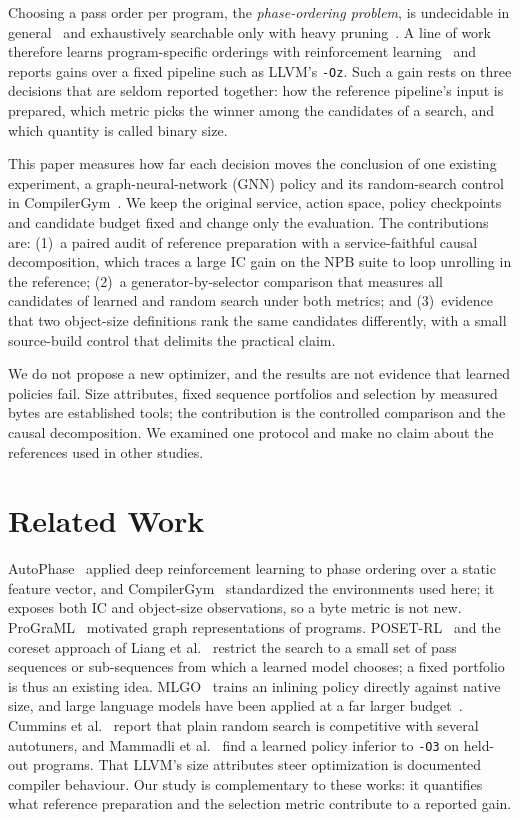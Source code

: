 \documentclass[conference,a4paper]{IEEEtran}
\begin{document}
Choosing a pass order per program, the \emph{phase-ordering problem},
is undecidable in general~\cite{touati2006} and exhaustively searchable
only with heavy pruning~\cite{kulkarni2006}. A line of work therefore
learns program-specific orderings with reinforcement
learning~\cite{autophase,compilergym,posetrl,coreset,mammadli} and
reports gains over a fixed pipeline such as LLVM's \texttt{-Oz}. Such a
gain rests on three decisions that are seldom reported together: how
the reference pipeline's input is prepared, which metric picks the
winner among the candidates of a search, and which quantity is called
binary size.

This paper measures how far each decision moves the conclusion of one
existing experiment, a graph-neural-network (GNN) policy and its
random-search control in CompilerGym~\cite{compilergym}. We keep the
original service, action space, policy checkpoints and candidate budget
fixed and change only the evaluation. The contributions are: (1)~a
paired audit of reference preparation with a service-faithful causal
decomposition, which traces a large IC gain on the NPB suite to loop
unrolling in the reference; (2)~a generator-by-selector comparison that
measures all candidates of learned and random search under both
metrics; and (3)~evidence that two object-size definitions rank the
same candidates differently, with a small source-build control that
delimits the practical claim.

We do not propose a new optimizer, and the results are not evidence
that learned policies fail. Size attributes, fixed sequence portfolios
and selection by measured bytes are established tools; the contribution
is the controlled comparison and the causal decomposition. We examined
one protocol and make no claim about the references used in other
studies.

\section{Related Work}
AutoPhase~\cite{autophase} applied deep reinforcement learning to phase
ordering over a static feature vector, and CompilerGym~\cite{compilergym}
standardized the environments used here; it exposes both IC and
object-size observations, so a byte metric is not new. ProGraML~\cite{programl}
motivated graph representations of programs. POSET-RL~\cite{posetrl}
and the coreset approach of Liang et al.~\cite{coreset} restrict the
search to a small set of pass sequences or sub-sequences from which a
learned model chooses; a fixed portfolio is thus an existing idea. MLGO~\cite{mlgo} trains
an inlining policy directly against native size, and large language
models have been applied at a far larger budget~\cite{llmcompiler}.
Cummins et al.~\cite{compilergym} report that plain random search is
competitive with several autotuners, and Mammadli et al.~\cite{mammadli} find a learned
policy inferior to \texttt{-O3} on held-out programs. That LLVM's size
attributes steer optimization is documented compiler behaviour. Our
study is complementary to these works: it quantifies what reference
preparation and the selection metric contribute to a reported gain.
\end{document}
